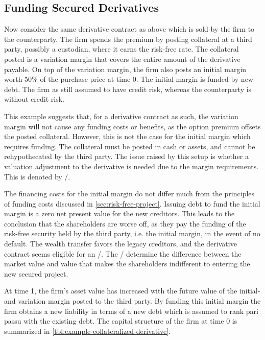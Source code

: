 \documentclass[../main.tex]{subfiles}
\begin{document}
    \subsection{Funding Secured Derivatives}
        Now consider the same derivative contract as above which is sold by the firm to the counterparty.
        The firm spends the premium by posting collateral at a third party, possibly a custodian, where it earns the risk-free rate.
        The collateral posted is a variation margin that covers the entire amount of the derivative payable.
        On top of the variation margin, the firm also posts an initial margin worth 50\% of the purchase price at time 0.
        The initial margin is funded by new debt.
        The firm as still assumed to have credit risk, whereas the counterparty is without credit risk.


        This example suggests that, for a derivative contract as such,
        the variation margin will not cause any funding costs or benefits,
        as the option premium offsets the posted collateral.
        However, this is not the case for the initial margin which requires funding.
        The collateral must be posted in cash or assets, and cannot be rehypothecated by the third party.
        The issue raised by this setup is whether a valuation adjustment to the derivative is needed due to the margin requirements.
        This is denoted by \MVA/.

        The financing costs for the initial margin do not differ much from the principles of funding costs discussed in \cref{sec:risk-free-project}.
        Issuing debt to fund the initial margin is a zero net present value for the new creditors.
        This leads to the conclusion that the shareholders are worse off, as they pay the funding of the risk-free security held by the third party, i.e. the initial margin, in the event of no default.
        The wealth transfer favors the legacy creditors,
        and the derivative contract seems eligible for an \MVA/.
        The \MVA/ determine the difference between the market value and value that makes the shareholders indifferent to entering the new secured project.

        At time 1, the firm's asset value has increased with the future value of the initial- and variation margin posted to the third party.
        By funding this initial margin the firm obtains a new liability in terms of a new debt which is assumed to rank pari passu with the existing debt.
        The capital structure of the firm at time 0 is summarized in \cref{tbl:example-collateralized-derivative}.
\end{document}
